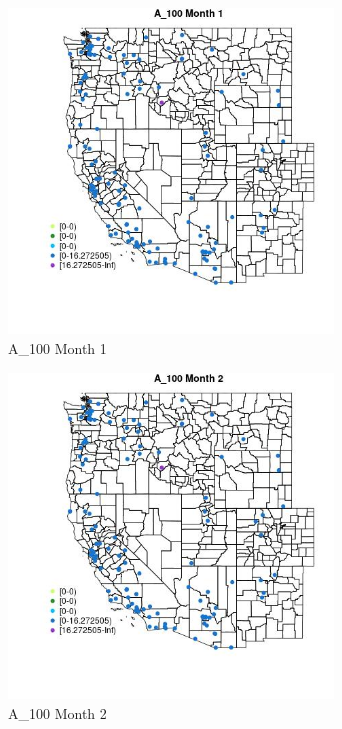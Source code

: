 \begin{figure} 
\centering  
\includegraphics[width=0.77\textwidth]{Code_Outputs/Report_ML_input_PM25_Step4_part_e_de_duplicated_aves_MapObsMo1A_100.jpg} 
\caption{\label{fig:Report_ML_input_PM25_Step4_part_e_de_duplicated_avesMapObsMo1A_100}A_100 Month 1} 
\end{figure} 
 

\begin{figure} 
\centering  
\includegraphics[width=0.77\textwidth]{Code_Outputs/Report_ML_input_PM25_Step4_part_e_de_duplicated_aves_MapObsMo2A_100.jpg} 
\caption{\label{fig:Report_ML_input_PM25_Step4_part_e_de_duplicated_avesMapObsMo2A_100}A_100 Month 2} 
\end{figure} 
 


